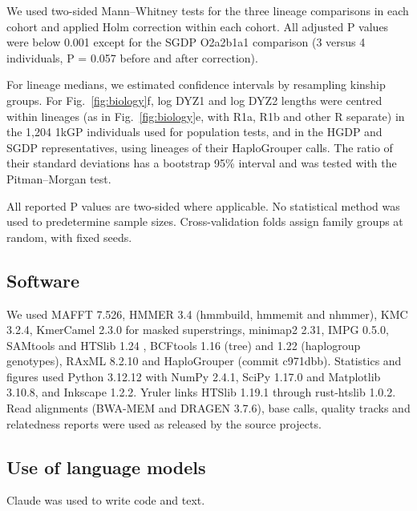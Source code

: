 We used two-sided Mann--Whitney tests for the three lineage comparisons in each cohort and applied Holm correction within each cohort. All adjusted P values were below 0.001 except for the SGDP O2a2b1a1 comparison (3 versus 4 individuals, P = 0.057 before and after correction).

For lineage medians, we estimated confidence intervals by resampling kinship groups. For Fig.~\ref{fig:biology}f, log DYZ1 and log DYZ2 lengths were centred within lineages (as in Fig.~\ref{fig:biology}e, with R1a, R1b and other R separate) in the 1,204 1kGP individuals used for population tests, and in the HGDP and SGDP representatives, using lineages of their HaploGrouper calls. The ratio of their standard deviations has a bootstrap 95\% interval and was tested with the Pitman--Morgan test.

All reported P values are two-sided where applicable. No statistical method was used to predetermine sample sizes. Cross-validation folds assign family groups at random, with fixed seeds.

\subsection{Software}
We used MAFFT 7.526, HMMER 3.4 (hmmbuild, hmmemit and nhmmer), KMC 3.2.4, KmerCamel 2.3.0 for masked superstrings, minimap2 2.31, IMPG 0.5.0, SAMtools and HTSlib 1.24 \cite{Danecek2021,Bonfield2021}, BCFtools 1.16 (tree) and 1.22 (haplogroup genotypes), RAxML 8.2.10 and HaploGrouper (commit c971dbb). Statistics and figures used Python 3.12.12 with NumPy 2.4.1, SciPy 1.17.0 and Matplotlib 3.10.8, and Inkscape 1.2.2. Yruler links HTSlib 1.19.1 through rust-htslib 1.0.2. Read alignments (BWA-MEM and DRAGEN 3.7.6), base calls, quality tracks and relatedness reports were used as released by the source projects.

\subsection{Use of language models}
Claude was used to write code and text.

